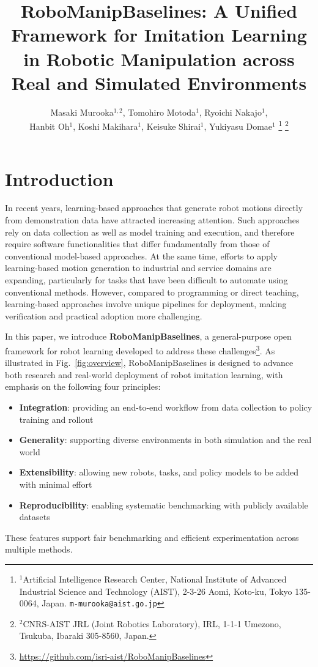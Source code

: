 \documentclass[letterpaper, 10 pt, conference]{ieeeconf}  %
\title{\LARGE \bf
  RoboManipBaselines: A Unified Framework for Imitation Learning in Robotic Manipulation across Real and Simulated Environments
}
\author{
Masaki Murooka$^{1,2}$, Tomohiro Motoda$^{1}$, Ryoichi Nakajo$^{1}$, \\Hanbit Oh$^{1}$, Koshi Makihara$^{1}$, Keisuke Shirai$^{1}$, Yukiyasu Domae$^{1}$%
\thanks{$^{1}$Artificial Intelligence Research Center,
National Institute of Advanced Industrial Science and Technology (AIST),
2-3-26 Aomi, Koto-ku, Tokyo 135-0064, Japan.
{\tt\small m-murooka@aist.go.jp}}%
\thanks{$^{2}$CNRS-AIST JRL (Joint Robotics Laboratory), IRL,
1-1-1 Umezono, Tsukuba, Ibaraki 305-8560, Japan.}%
}
\newcommand{\figref}[1]{{Fig.~\ref{#1}}}
\begin{document}
\maketitle
\thispagestyle{empty}
\pagestyle{empty}

\setlength{\floatsep}{8pt}
\setlength{\textfloatsep}{8pt}
\setlength{\abovecaptionskip}{4pt}
\setlength{\abovedisplayskip}{4pt}
\setlength{\belowdisplayskip}{4pt}



\section{Introduction}

In recent years, learning-based approaches that generate robot motions directly from demonstration data have attracted increasing attention.
Such approaches rely on data collection as well as model training and execution, and therefore require software functionalities that differ fundamentally from those of conventional model-based approaches.
At the same time, efforts to apply learning-based motion generation to industrial and service domains are expanding, particularly for tasks that have been difficult to automate using conventional methods.
However, compared to programming or direct teaching, learning-based approaches involve unique pipelines for deployment, making verification and practical adoption more challenging.

In this paper, we introduce \textbf{RoboManipBaselines}, a general-purpose open framework for robot learning developed to address these challenges\footnote{\url{https://github.com/isri-aist/RoboManipBaselines}}.
As illustrated in \figref{fig:overview}, RoboManipBaselines is designed to advance both research and real-world deployment of robot imitation learning, with emphasis on the following four principles:
\begin{itemize}
\item \textbf{Integration}: providing an end-to-end workflow from data collection to policy training and rollout
\item \textbf{Generality}: supporting diverse environments in both simulation and the real world
\item \textbf{Extensibility}: allowing new robots, tasks, and policy models to be added with minimal effort
\item \textbf{Reproducibility}: enabling systematic benchmarking with publicly available datasets
\end{itemize}
These features support fair benchmarking and efficient experimentation across multiple methods.
\end{document}
